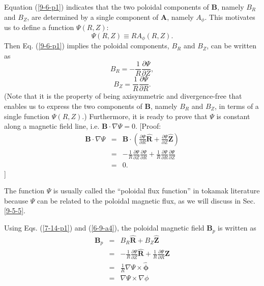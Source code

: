 \documentclass{llncs}
\newcommand{\tmmathbf}[1]{\ensuremath{\boldsymbol{#1}}}
\begin{document}
Equation (\ref{9-6-p1}) indicates that the two poloidal components of
$\mathbf{B}$, namely $B_R$ and $B_Z$, are determined by a single component of
$\mathbf{A}$, namely $A_{\phi}$. This motivates us to define a function $\Psi
(R, Z)$:
\begin{equation}
  \label{2-14-1} \Psi (R, Z) \equiv R A_{\phi} (R, Z) .
\end{equation}
Then Eq. (\ref{9-6-p1}) implies the poloidal components, $B_R$ and $B_Z$, can
be written as
\begin{equation}
  \label{7-14-p1} B_R = - \frac{1}{R} \frac{\partial \Psi}{\partial Z},
\end{equation}
\begin{equation}
  \label{6-9-a4} B_Z = \frac{1}{R} \frac{\partial \Psi}{\partial R} .
\end{equation}
(Note that it is the property of being axisymmetric and divergence-free that
enables us to express the two components of $\mathbf{B}$, namely $B_R$ and
$B_Z$, in terms of a single function $\Psi (R, Z)$.) Furthermore, it is ready
to prove that $\Psi$ is constant along a magnetic field line, i.e. $\mathbf{B}
\cdot \nabla \Psi = 0$. [Proof:
\begin{eqnarray}
  \mathbf{B} \cdot \nabla \Psi & = & \mathbf{B} \cdot \left( \frac{\partial
  \Psi}{\partial R} \hat{\mathbf{R}} + \frac{\partial \Psi}{\partial Z}
  \hat{\mathbf{Z}} \right) \nonumber\\
  & = & - \frac{1}{R} \frac{\partial \Psi}{\partial Z} \frac{\partial
  \Psi}{\partial R} + \frac{1}{R} \frac{\partial \Psi}{\partial R}
  \frac{\partial \Psi}{\partial Z} \nonumber\\
  & = & 0. 
\end{eqnarray}
]

The function $\Psi$ is usually called the ``poloidal flux function'' in
tokamak literature because $\Psi$ can be related to the poloidal magnetic
flux, as we will discuss in Sec. \ref{9-5-5}.

Using Eqs. (\ref{7-14-p1}) and (\ref{6-9-a4}), the poloidal magnetic field
$\mathbf{B}_p$ is written as
\begin{eqnarray}
  \mathbf{B}_p & = & B_R \hat{\mathbf{R}} + B_Z \hat{\mathbf{Z}} \nonumber\\
  & = & - \frac{1}{R} \frac{\partial \Psi}{\partial Z} \hat{\mathbf{R}} +
  \frac{1}{R} \frac{\partial \Psi}{\partial R} \hat{\mathbf{Z}} \nonumber\\
  & = & \frac{1}{R} \nabla \Psi \times \hat{\tmmathbf{\phi}} \nonumber\\
  & = & \nabla \Psi \times \nabla \phi  \label{20-5-9-p10}
\end{eqnarray}
\end{document}
